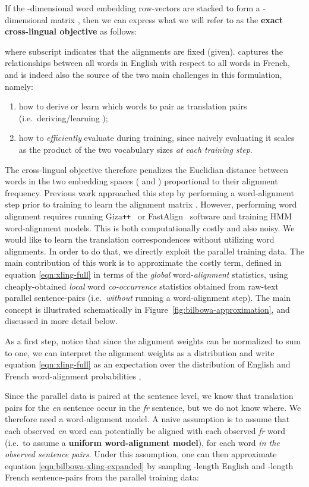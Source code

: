 \documentclass[10pt]{article}
\newcommand\plpl{\texttt{++}}
\newcommand\bld[1]{\textbf{#1}}
\begin{document}
If the -dimensional word embedding row-vectors 
are stacked to form a -dimensional matrix , then we can express
what we will refer to as the \bld{exact cross-lingual objective} as follows: 

where subscript  indicates that the alignments are fixed (given).  captures the 
relationships between all  words in English
with respect to all  words in French, and is indeed also
the source of the two main challenges in this formulation, namely: 
\begin{enumerate}
  \item how to derive or learn which words to pair as translation pairs (i.e.\ 
    deriving/learning ); 
  \item how to \emph{efficiently} evaluate  during training, since 
    naively evaluating it scales as the product of the two vocabulary sizes 
     \emph{at each training step}.
\end{enumerate}

The cross-lingual objective therefore penalizes the Euclidian distance between
words in the two embedding spaces ( and )
proportional to their alignment frequency. Previous work approached this step
by performing a word-alignment step prior to training to learn the alignment
matrix .  However, performing word alignment requires running
Giza\plpl~\cite{och03giza} or FastAlign~\cite{dyer2013simple} software and
training HMM word-alignment models. This is both computationally costly and
also noisy. We would like to learn the translation correspondences without
utilizing word alignments.  In order to do that, we directly exploit the
parallel training data.  The main contribution of this work is to approximate
the costly  term, defined in equation \ref{eqn:xling-full} in terms of
the \emph{global} word-\emph{alignment} statistics, using cheaply-obtained 
\emph{local} word \emph{co-occurrence} statistics obtained from raw-text parallel sentence-pairs
(i.e.\ \emph{without} running a word-alignment step).  The main concept is illustrated
schematically in Figure~\ref{fig:bilbowa-approximation}, and discussed in more
detail below.

As a first step,
notice that since the alignment weights can be normalized to sum to one, we can interpret the
alignment weights as a distribution and write equation \ref{eqn:xling-full} as an
expectation over the distribution of English and French word-alignment
probabilities ,

Since the parallel data is paired at the sentence level, we know that translation pairs for
the \emph{en} sentence occur in the \emph{fr} sentence, but we do not know
where. We therefore need a word-alignment model. 
A naive assumption is to assume that each observed
\emph{en} word can potentially be aligned with each observed \emph{fr} word (i.e.\
to assume a \bld{uniform word-alignment model}), for each word \emph{in the
observed sentence pairs}.  Under this assumption, one can then approximate
equation \ref{eqn:bilbowa-xling-expanded} by sampling  -length English and
-length French sentence-pairs  from the parallel training
data: 
\end{document}
